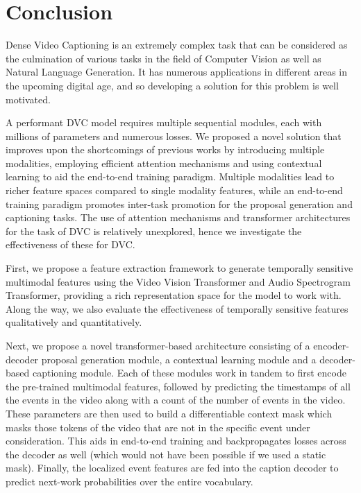 \section{Conclusion}

\par Dense Video Captioning is an extremely complex task that can be considered as the culmination of various tasks in the field of Computer Vision as well as Natural Language Generation. It has numerous applications in different areas in the upcoming digital age, and so developing a solution for this problem is well motivated.

\par A performant DVC model requires multiple sequential modules, each with millions of parameters and numerous losses. We proposed a novel solution that improves upon the shortcomings of previous works by introducing multiple modalities, employing efficient attention mechanisms and using contextual learning to aid the end-to-end training paradigm. Multiple modalities lead to richer feature spaces compared to single modality features, while an end-to-end training paradigm promotes inter-task promotion for the proposal generation and captioning tasks. The use of attention mechanisms and transformer architectures for the task of DVC is relatively unexplored, hence we investigate the effectiveness of these for DVC.

\par First, we propose a feature extraction framework to generate temporally sensitive multimodal features using the Video Vision Transformer and Audio Spectrogram Transformer, providing a rich representation space for the model to work with. Along the way, we also evaluate the effectiveness of temporally sensitive features qualitatively and quantitatively.

\par Next, we propose a novel transformer-based architecture consisting of a encoder-decoder proposal generation module, a contextual learning module and a decoder-based captioning module. Each of these modules work in tandem to first encode the pre-trained multimodal features, followed by predicting the timestamps of all the events in the video along with a count of the number of events in the video. These parameters are then used to build a differentiable context mask which masks those tokens of the video that are not in the specific event under consideration. This aids in end-to-end training and backpropagates losses across the decoder as well (which would not have been possible if we used a static mask). Finally, the localized event features are fed into the caption decoder to predict next-work probabilities over the entire vocabulary.

